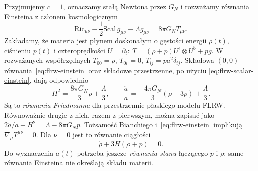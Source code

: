 \begin{przyklad}
\label{prz:flrw-friedmann}
Przyjmujemy $c=1$, oznaczamy stałą Newtona przez $G_{\!N}$
i rozważamy równania Einsteina z członem kosmologicznym
\begin{equation}\label{eq:flrw-einstein}
 \mathrm{Ric}_{\mu\nu}-\frac12\mathrm{Scal}\,g_{\mu\nu}
 +\Lambda g_{\mu\nu}=8\pi G_{\!N}T_{\mu\nu}.
\end{equation}
Zakładamy, że materia jest płynem doskonałym
o gęstości energii $\rho(t)$, ciśnieniu $p(t)$
i czteroprędkości $U=\partial_t$:
$T=(\rho+p)U^\flat\otimes U^\flat+pg$.
W rozważanych współrzędnych $T_{00}=\rho$,
$T_{0i}=0$, $T_{ij}=pa^2\delta_{ij}$.
Składowa $(0,0)$ równania~\eqref{eq:flrw-einstein}
oraz składowe przestrzenne, po użyciu
\eqref{eq:flrw-scalar-einstein}, dają odpowiednio
\begin{equation}\label{eq:flrw-friedmann}
 H^2=\frac{8\pi G_{\!N}}3\rho+\frac{\Lambda}{3},
 \qquad
 \frac{\ddot a}{a}=-\frac{4\pi G_{\!N}}3(\rho+3p)
 +\frac{\Lambda}{3}.
\end{equation}
Są to \emph{równania Friedmanna} dla przestrzennie płaskiego
modelu FLRW. Równoważnie drugie z nich, razem z pierwszym,
można zapisać jako
$2\ddot a/a+H^2=\Lambda-8\pi G_{\!N}p$.
Tożsamość Bianchiego i~\eqref{eq:flrw-einstein} implikują
$\nabla_\mu T^{\mu\nu}=0$. Dla $\nu=0$ jest to równanie
ciągłości
\begin{equation}\label{eq:flrw-ciaglosc}
 \dot\rho+3H(\rho+p)=0.
\end{equation}
Do wyznaczenia $a(t)$ potrzeba jeszcze \emph{równania stanu}
łączącego $p$ i $\rho$: same równania Einsteina
nie określają składu materii.
\end{przyklad}

